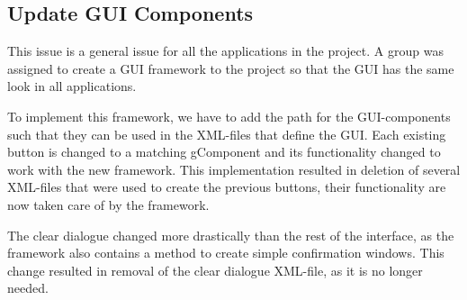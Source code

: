 \subsection{Update GUI Components}
This issue is a general issue for all the applications in the project. 
A group was assigned to create a GUI framework to the project so that the GUI has the same look in all applications.

To implement this framework, we have to add the path for the GUI-components such that they can be used in the XML-files that define the GUI.
Each existing button is changed to a matching gComponent and its functionality changed to work with the new framework.
This implementation resulted in deletion of several XML-files that were used to create the previous buttons, their functionality are now taken care of by the framework.

The clear dialogue changed more drastically than the rest of the interface, as the framework also contains a method to create simple confirmation windows. 
This change resulted in removal of the clear dialogue XML-file, as it is no longer needed.